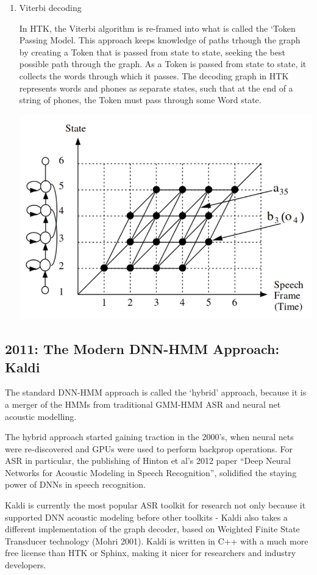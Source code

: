 \documentclass[10pt,a4paper]{article}
\begin{document}
\begin{enumerate}
  
  \item Viterbi decoding 

    In HTK, the Viterbi algorithm is re-framed into what is called the `Token Passing Model. This approach keeps knowledge of paths trhough the graph by creating a Token that is passed from state to state, seeking the best possible path through the graph. As a Token is passed from state to state, it collects the words through which it passes. The decoding graph in HTK represents words and phones as separate states, such that at the end of a string of phones, the Token must pass through some Word state. 

    
    \begin{center}
      \includegraphics[width=.7\textwidth,keepaspectratio]{figs/htk-viterbi.png}
    \end{center}
    
\end{enumerate}






\subsection{2011: The Modern DNN-HMM Approach: Kaldi}

The standard DNN-HMM approach is called the `hybrid' approach, because it is a merger of the HMMs from traditional GMM-HMM ASR and neural net acoustic modelling.

The hybrid approach started gaining traction in the 2000's, when neural nets were re-discovered and GPUs were used to perform backprop operations. For ASR in particular, the publishing of Hinton et al's 2012 paper ``Deep Neural Networks for Acoustic Modeling in Speech Recognition'', solidified the staying power of DNNs in speech recognition.

Kaldi is currently the most popular ASR toolkit for research not only because it supported DNN acoustic modeling before other toolkits - Kaldi also takes a different implementation of the graph decoder, based on Weighted Finite State Transducer technology (Mohri 2001). Kaldi is written in C++ with a much more free license than HTK or Sphinx, making it nicer for researchers and industry developers.
\end{document}
